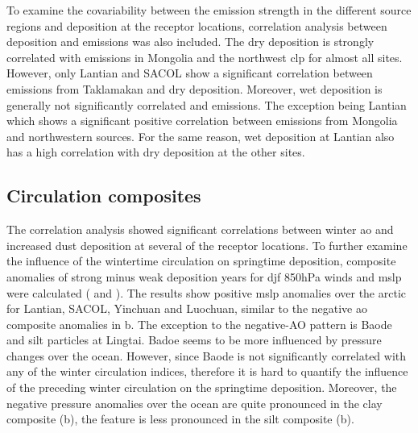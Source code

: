 To examine the covariability between the emission strength in the different source regions and deposition at the receptor locations, correlation analysis between deposition and emissions was also included. 
The dry deposition is strongly correlated with emissions in Mongolia and the northwest \acrshort{clp} for almost all sites. However, only Lantian and SACOL show a significant correlation between emissions from Taklamakan and dry deposition. 
Moreover, wet deposition is generally not significantly correlated and emissions. 
The exception being Lantian which shows a significant positive correlation between emissions from Mongolia and northwestern sources. For the same reason, wet deposition at Lantian also has a high correlation with dry deposition at the other sites.  



\subsection{Circulation composites}
The correlation analysis showed significant correlations between winter \acrshort{ao} and increased dust deposition at several of the receptor locations. 
To further examine the influence of the wintertime circulation on springtime deposition,  composite anomalies of strong minus weak deposition years for \acrshort{djf} 850hPa winds and \acrshort{mslp} were calculated ( and ). The results show positive \acrshort{mslp} anomalies over the arctic for Lantian, SACOL, Yinchuan and Luochuan, similar to the negative \acrshort{ao} composite anomalies in b. 
The exception to the negative-AO pattern is Baode and silt particles at Lingtai. Badoe seems to be more influenced by pressure changes over the ocean. However, since Baode is not significantly correlated with any of the winter circulation indices, therefore it is hard to quantify the influence of the preceding winter circulation on the springtime deposition. Moreover, the negative pressure anomalies over the ocean are quite pronounced in the clay composite (b), the feature is less pronounced in the silt composite (b).       

